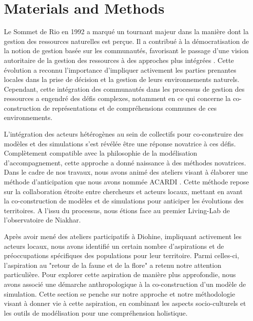 \documentclass{article}
\begin{document}

\section{Materials and Methods}

Le Sommet de Rio en 1992 a marqué un tournant majeur dans la manière dont la gestion des ressources naturelles est perçue. Il a contribué à la démocratisation de la notion de gestion basée sur les communautés, favorisant le passage d'une vision autoritaire de la gestion des ressources à des approches plus intégrées \cite{delay_coming_2022}. Cette évolution a reconnu l'importance d'impliquer activement les parties prenantes locales dans la prise de décision et la gestion de leurs environnements naturels. Cependant, cette intégration des communautés dans les processus de gestion des ressources a engendré des défis complexes, notamment en ce qui concerne la co-construction de représentations et de compréhensions communes de ces environnements.

L'intégration des acteurs hétérogènes au sein de collectifs pour co-construire des modèles et des simulations s'est révélée être une réponse novatrice à ces défis. Complètement compatible avec la philosophie de la modélisation d'accompagnement, cette approche a donné naissance à des méthodes novatrices. Dans le cadre de nos travaux, nous avons animé des ateliers visant à élaborer une méthode d'anticipation que nous avons nommée ACARDI \cite{perrotton_definition_2021}. Cette méthode repose sur la collaboration étroite entre chercheurs et acteurs locaux, mettant en avant la co-construction de modèles et de simulations pour anticiper les évolutions des territoires. A l'issu du processus, nous étions face au premier Living-Lab de l'observatoire de Niakhar.

Après avoir mené des ateliers participatifs à Diohine, impliquant activement les acteurs locaux, nous avons identifié un certain nombre d'aspirations et de préoccupations spécifiques des populations pour leur territoire. Parmi celles-ci, l'aspiration au "retour de la faune et de la flore" a retenu notre attention particulière. Pour explorer cette aspiration de manière plus approfondie, nous avons associé une démarche anthropologique à la co-construction d'un modèle de simulation. Cette section se penche sur notre approche et notre méthodologie visant à donner vie à cette aspiration, en combinant les aspects socio-culturels et les outils de modélisation pour une compréhension holistique.
\end{document}
